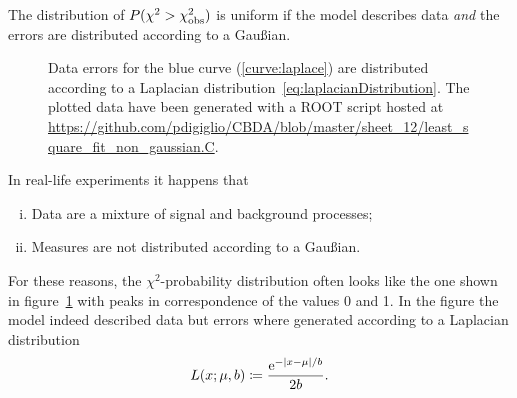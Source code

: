 The distribution of $P(\chi^2 > \chi^2_\textup{obs})$ is uniform if the model describes data \emph{and} the errors are distributed according to a Gau\ss{}ian.
\begin{figure}
	\centering
	\caption{Data errors for the blue curve (\ref{curve:laplace}) are distributed according to a Laplacian distribution~\eqref{eq:laplacianDistribution}.
	The plotted data have been generated with a {\sf\small ROOT} script hosted at \url{https://github.com/pdigiglio/CBDA/blob/master/sheet_12/least_square_fit_non_gaussian.C}.}
	\label{fig:chiSquareProbNonFlat}
\end{figure}
In real-life experiments it happens that
\begin{enumerate}[i.]
	\item
		Data are a mixture of signal and background processes;
	\item
		Measures are not distributed according to a Gau\ss{}ian.
\end{enumerate}
For these reasons, the $\chi^2$-probability distribution often looks like the one shown in figure~\ref{fig:chiSquareProbNonFlat} with peaks in correspondence of the values \num{0} and \num{1}.
In the figure the model indeed described data but errors where generated according to a Laplacian distribution
\begin{equation}\label{eq:laplacianDistribution}
	L(x;\mu,b) \coloneqq \frac{\mathrm{e}^{-\lvert x-\mu\rvert/b}}{2b}.
\end{equation}




